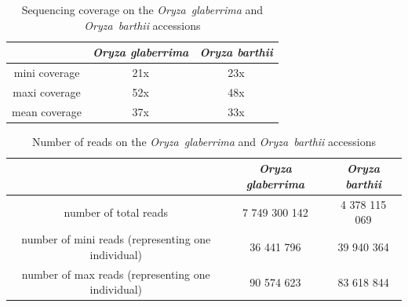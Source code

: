 \documentclass[10pt,letterpaper]{article}
\begin{document}
\clearpage
\newpage
\newcommand{\beginsupplement}{%
        \setcounter{table}{0}
        \renewcommand{\thetable}{S\arabic{table}}%
        \setcounter{figure}{0}
        \renewcommand{\thefigure}{S\arabic{figure}}%
     }
     
\beginsupplement
\begin{table}
\footnotesize
      \begin{center}
	\begin{tabular}{|c|c|c|}
	  \hline
	  &  \emph{Oryza glaberrima}  &  \emph{Oryza barthii} \\
	  \hline
	  mini coverage  &  21x  &  23x  \\
	  \hline
	  maxi coverage  &  52x  &  48x  \\
	  \hline
	  mean coverage  &  37x  &  33x  \\
	  \hline
	\end{tabular}
      \end{center}
    \caption{Sequencing coverage on the \emph{Oryza~glaberrima} and \emph{Oryza~barthii} accessions}
    \label{statCouverture}
    \end{table}
    
    \begin{table}
    \footnotesize
      \begin{center}
	\begin{tabular}{|c|c|c|}
	  \hline
	  &  \emph{Oryza glaberrima}  &  \emph{Oryza barthii} \\
	  \hline
	  number of total reads &  7 749 300 142  &  4 378 115 069  \\
	  \hline
	  number of mini reads (representing one individual)  &  36 441 796  &  39 940 364  \\
	  \hline
	  number of max reads (representing one individual)  &  90 574 623  &  83 618 844  \\
	  \hline
	\end{tabular}
      \end{center}
    \caption{Number of reads on the \emph{Oryza~glaberrima} and \emph{Oryza~barthii} accessions}
    \label{statReads}
    \end{table}
    
\end{document}
